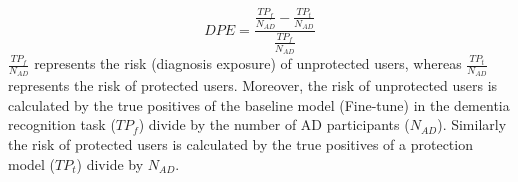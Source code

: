 \documentclass[lettersize,journal]{IEEEtran}
\begin{document}
\begin{equation}
DPE = \frac{\frac{TP_f}{N_{AD}} - \frac{TP_t}{N_{AD}}}{\frac{TP_f}{N_{AD}}}
\end{equation}
$\frac{TP_f}{N_{AD}}$ represents the risk (diagnosis exposure) of unprotected users, whereas $\frac{TP_t}{N_{AD}}$ represents the risk of protected users. Moreover, the risk of unprotected users is calculated by the true positives of the baseline model (Fine-tune) in the dementia recognition task ($TP_f$) divide by the number of AD participants ($N_{AD}$). Similarly the risk of protected users is calculated by the true positives of a protection model ($TP_t$) divide by $N_{AD}$.

\end{document}
